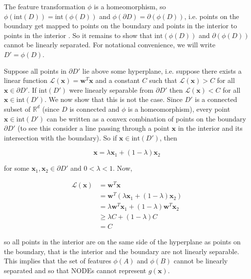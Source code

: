 \documentclass{article}
\begin{document}
The feature transformation $\phi$ is a homeomorphism, so $\phi(\text{int}(D)) = \text{int}(\phi(D))$ and $\phi(\partial D) = \partial(\phi(D))$, i.e. points on the boundary get mapped to points on the boundary and points in the interior to points in the interior \citep{armstrong2013basic}. So it remains to show that $\text{int}(\phi(D))$ and $\partial(\phi(D))$ cannot be linearly separated. For notational convenience, we will write $D' = \phi(D)$.

Suppose all points in $\partial D'$ lie above some hyperplane, i.e. suppose there exists a linear function $\mathcal{L}(\mathbf{x}) = \mathbf{w}^T \mathbf{x}$ and a constant $C$ such that $\mathcal{L}(\mathbf{x}) > C$ for all $\mathbf{x} \in \partial D'$. If $\text{int}(D')$ were linearly separable from $\partial D'$ then $\mathcal{L}(\mathbf{x}) < C$ for all $\mathbf{x} \in \text{int}(D')$. We now show that this is not the case. Since $D'$ is a connected subset of $\mathbb{R}^d$ (since $D$ is connected and $\phi$ is a homeomorphism), every point $\mathbf{x} \in \text{int}(D')$ can be written as a convex combination of points on the boundary $\partial D'$ (to see this consider a line passing through a point $\mathbf{x}$ in the interior and its intersection with the boundary). So if $\mathbf{x} \in \text{int}(D')$, then

\[
\mathbf{x} = \lambda \mathbf{x}_1 + (1 - \lambda) \mathbf{x}_2
\]

for some $\mathbf{x}_1, \mathbf{x}_2 \in \partial D'$ and $0 < \lambda < 1$. Now,

\[
\begin{split}
\mathcal{L}(\mathbf{x}) & = \mathbf{w}^T \mathbf{x} \\
                        & = \mathbf{w}^T (\lambda \mathbf{x}_1 + (1 - \lambda) \mathbf{x}_2) \\
                        & = \lambda \mathbf{w}^T \mathbf{x}_1 + (1 - \lambda) \mathbf{w}^T \mathbf{x}_2 \\
                        & \geq \lambda C + (1 - \lambda) C \\
                        & = C
\end{split}
\]

so all points in the interior are on the same side of the hyperplane as points on the boundary, that is the interior and the boundary are not linearly separable. This implies that the set of features $\phi(A)$ and $\phi(B)$ cannot be linearly separated and so that NODEs cannot represent $g(\mathbf{x})$.
\end{document}
